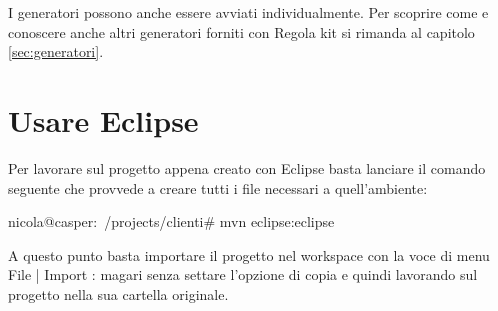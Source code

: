 \begin{nota}
I generatori possono anche essere avviati individualmente. Per scoprire come e conoscere anche altri generatori forniti con Regola kit si rimanda al capitolo \vref{sec:generatori}.
\end{nota}

\section{Usare Eclipse}
Per lavorare sul progetto appena creato con Eclipse basta lanciare il comando seguente che provvede a creare tutti i file necessari a quell'ambiente:

\begin{bash}
nicola@casper:~/projects/clienti# mvn eclipse:eclipse
\end{bash}

A questo punto basta importare il progetto nel workspace con la voce di menu   File | Import : magari senza settare l'opzione di copia e quindi lavorando sul progetto nella sua cartella originale.





